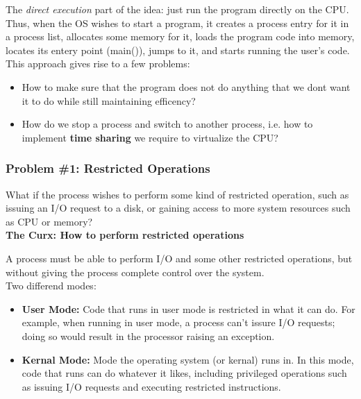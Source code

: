 The \textit{direct execution} part of the idea: just run the program directly
on the CPU. Thus, when the OS wishes to start a program, it creates a process
entry for it in a process list, allocates some memory for it, loads the program
code into memory, locates its entery point (main()), jumps to it, and starts
running the user's code.\\

This approach gives rise to a few problems:

\begin{itemize}
    \item How to make sure that the program does not do anything that we dont
        want it to do while still maintaining efficency?
    \item How do we stop a process and switch to another process, i.e. how
        to implement \textbf{time sharing} we require to virtualize the CPU?
\end{itemize}

\subsubsection{Problem \#1: Restricted Operations}

What if the process wishes to perform some kind of restricted operation, such
as issuing an I/O request to a disk, or gaining access to more system resources
such as CPU or memory?\\

\textbf{The Curx: How to perform restricted operations}

A process must be able
to perform I/O and some other restricted operations, but without giving the
process complete control over the system.\\

Two differend modes:

\begin{itemize}
    \item \textbf{User Mode:} Code that runs in user mode is restricted in what
        it can do. For example, when running in user mode, a process can't
        issure I/O requests; doing so would result in the processor raising an
        exception.
    \item \textbf{Kernal Mode:} Mode the operating system (or kernal) runs in.
        In this mode, code that runs can do whatever it likes, including
        privileged operations such as issuing I/O requests and executing
        restricted instructions.
\end{itemize}

